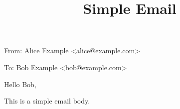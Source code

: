 \documentclass[11pt,a4paper]{article}
\title{Simple Email}
\begin{document}
\maketitle

From: Alice Example <alice@example.com>

To: Bob Example <bob@example.com>

Hello Bob,

This is a simple email body.
\end{document}
